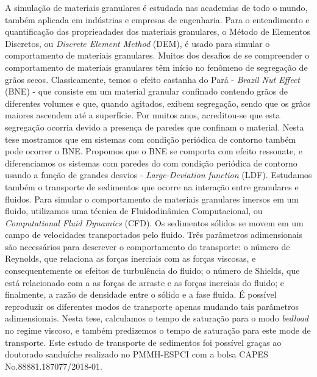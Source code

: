 
\begin{resumo}
    A simulação de materiais granulares é estudada nas academias de todo o mundo, também aplicada em indústrias e empresas de engenharia. Para o entendimento e quantificação das proprieadades dos materiais granulares, o Método de Elementos Discretos, ou \textit{Discrete Element Method} (DEM), é usado para simular o comportamento de materiais granulares.
    Muitos dos desafios de se compreender o comportamento de materiais granulares têm início no fenômeno de segregação de grãos secos. Classicamente, temos o efeito castanha do Pará - \textit{Brazil Nut Effect} (BNE) - que consiste em um material granular confinado contendo grãos de diferentes volumes e que, quando agitados, exibem segregação, sendo que os grãos maiores ascendem até a superfície. Por muitos anos, acreditou-se que esta segregação ocorria devido a presença de paredes que confinam o material. Nesta tese mostramos que em sistemas com condição periódica de contorno também pode ocorrer o BNE. Propomos que o BNE se comporta com efeito ressonate, e diferenciamos os sistemas com paredes do com condição periódica de contorno usando a função de grandes desvios - \textit{Large-Deviation function} (LDF).
    Estudamos também o transporte de sedimentos que ocorre na interação entre granulares e fluidos. Para simular o comportamento de materiais granulares imersos em um fluido, utilizamos uma técnica de Fluidodinâmica Computacional, ou \textit{Computational Fluid Dynamics} (CFD). Os sedimentos sólidos se movem em um campo de velocidades transportados pelo fluido. Três parâmetros adimensionais são necessários para descrever o comportamento do transporte: o número de Reynolds, que relaciona as forças inerciais com as forças viscosas, e consequentemente os efeitos de turbulência do fluido; o número de Shields, que está relacionado com a as forças de arraste e as forças inerciais do fluido; e finalmente, a razão de densidade entre o sólido e a fase fluida. É possível reproduzir os diferentes modos de transporte apenas mudando tais parâmetros adimensionais. Nesta tese, calculamos o tempo de saturação para o modo \textit{bedload} no regime viscoso, e também predizemos o tempo de saturação para este mode de transporte. Este estudo de transporte de sedimentos foi possível graças ao doutorado sanduíche realizado no PMMH-ESPCI com a bolsa CAPES No.88881.187077/2018-01.


\end{resumo}
